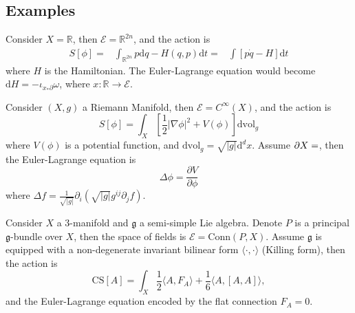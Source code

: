 \documentclass[10pt]{article}
\begin{document}
\subsection{Examples}

\begin{example}
  Consider $ X = \mathbb{R}$, then $ \mathcal{E} = \mathbb{R}^{2n}$, and the action is
  \begin{equation*}
    \begin{aligned}
      S[\phi] = & \int _{\mathbb{R}^{2n}} p \mathrm{d} q - H(q,p) \mathrm{d} t
      = & \int \left[ p \dot{q} - H \right]\mathrm{d} t
    \end{aligned}
  \end{equation*}
  where $ H$ is the Hamiltonian. The Euler-Lagrange equation would become $ \mathrm{d} H = - \iota_{x_{*} \partial} \omega$, where $ x: \mathbb{R}\rightarrow \mathcal{E}$.
\end{example}

\begin{example}
  Consider $(X,g)$ a Riemann Manifold, then $ \mathcal{E} = C^{\infty }(X)$, and the action is
  \begin{equation*}
    S[\phi] = \int _{X} \left[ \frac{1}{2} \left| \nabla \phi \right|^{2} + V(\phi) \right] \mathrm{d} \mathrm{vol}_{g}
  \end{equation*}
  where $ V(\phi)$ is a potential function, and $ \mathrm{d} \mathrm{vol}_{g} = \sqrt{\left| g \right|} \mathrm{d}^{d} x$. Assume $\partial X = \empty$, then the Euler-Lagrange equation is
  \begin{equation*}
    \Delta \phi = \frac{\partial V}{\partial \phi}
  \end{equation*}
  where $ \Delta f = \frac{1}{\sqrt{\left| g \right|}} \partial_{i}\left( \sqrt{\left| g \right|} g^{ij} \partial_{j} f\right)$.
\end{example}

\begin{example}
  Consider $ X$ a 3-manifold and $ \mathfrak{g}$ a semi-simple Lie algebra. Denote $ P$ is a principal $ \mathfrak{g}$-bundle over $ X$, then the space of fields is $ \mathcal{E} = \mathrm{Conn}(P,X)$. Assume $ \mathfrak{g}$ is equipped with a non-degenerate invariant bilinear form $ \langle \cdot, \cdot \rangle$ (Killing form), then the action is
  \begin{equation*}
    \mathrm{CS}[A] = \int _{X} \frac{1}{2} \langle A, F_{A} \rangle + \frac{1}{6} \langle A, [A,A] \rangle,
  \end{equation*}
  and the Euler-Lagrange equation encoded by the flat connection $ F_{A} = 0$.
\end{example}
\end{document}

